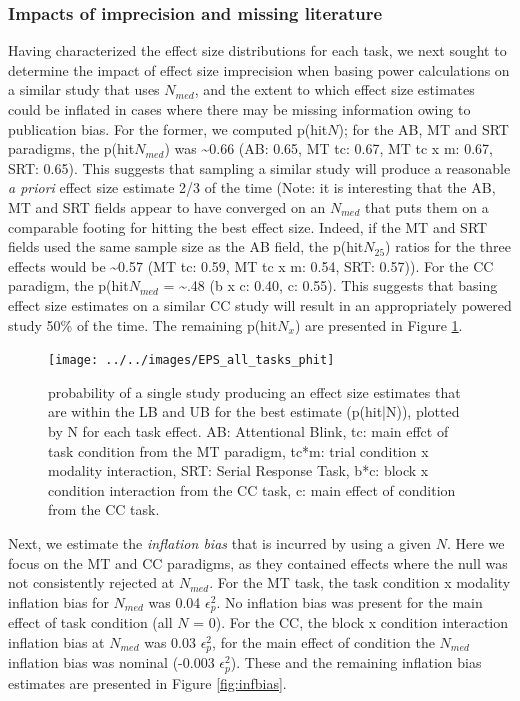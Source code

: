\documentclass[
  man]{apa6}
\begin{document}
\hypertarget{impacts-of-imprecision-and-missing-literature}{%
\subsubsection{Impacts of imprecision and missing literature}\label{impacts-of-imprecision-and-missing-literature}}

Having characterized the effect size distributions for each task, we next sought to determine the impact of effect size imprecision when basing power calculations on a similar study that uses \(N_{med}\), and the extent to which effect size estimates could be inflated in cases where there may be missing information owing to publication bias. For the former, we computed p(hit\textbar{}\(N\)); for the AB, MT and SRT paradigms, the p(hit\textbar{}\(N_{med}\)) was \textasciitilde0.66 (AB: 0.65, MT tc: 0.67, MT tc x m: 0.67, SRT: 0.65). This suggests that sampling a similar study will produce a reasonable \emph{a priori} effect size estimate 2/3 of the time (Note: it is interesting that the AB, MT and SRT fields appear to have converged on an \(N_{med}\) that puts them on a comparable footing for hitting the best effect size. Indeed, if the MT and SRT fields used the same sample size as the AB field, the p(hit\textbar{}\(N_{25}\)) ratios for the three effects would be \textasciitilde0.57 (MT tc: 0.59, MT tc x m: 0.54, SRT: 0.57)). For the CC paradigm, the p(hit\textbar{}\(N_{med}\) = \textasciitilde.48 (b x c: 0.40, c: 0.55). This suggests that basing effect size estimates on a similar CC study will result in an appropriately powered study 50\% of the time. The remaining p(hit\textbar{}\(N_x\)) are presented in Figure \ref{fig:fxphit}.

\begin{figure}

{\centering \texttt{[image: ../../images/EPS\_all\_tasks\_phit]} 

}

\caption{probability of a single study producing an effect size estimates that are within the LB and UB for the best estimate (p(hit|N)), plotted by N for each task effect. AB: Attentional Blink, tc: main effct of task condition from the MT paradigm, tc*m: trial condition x modality interaction, SRT: Serial Response Task, b*c: block x condition interaction from the CC task, c: main effect of condition from the CC task.}\label{fig:fxphit}
\end{figure}

Next, we estimate the \emph{inflation bias} that is incurred by using a given \(N\). Here we focus on the MT and CC paradigms, as they contained effects where the null was not consistently rejected at \(N_{med}\). For the MT task, the task condition x modality inflation bias for \(N_{med}\) was 0.04 \(\epsilon_p^2\). No inflation bias was present for the main effect of task condition (all \(N\) = 0). For the CC, the block x condition interaction inflation bias at \(N_{med}\) was 0.03 \(\epsilon_p^2\), for the main effect of condition the \(N_{med}\) inflation bias was nominal (-0.003 \(\epsilon_p^2\)). These and the remaining inflation bias estimates are presented in Figure \ref{fig:infbias}.
\end{document}

